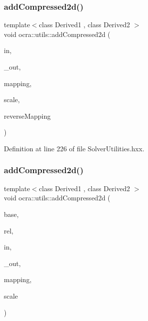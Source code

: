 \subsubsection{\texorpdfstring{add\+Compressed2d()}{addCompressed2d()}\hspace{0.1cm}{\footnotesize\ttfamily [1/2]}}
{\footnotesize\ttfamily template$<$class Derived1 , class Derived2 $>$ \\
void ocra\+::utils\+::add\+Compressed2d (\begin{DoxyParamCaption}\item[{const Matrix\+Base$<$ Derived1 $>$ \&}]{in,  }\item[{Matrix\+Base$<$ Derived2 $>$ const \&}]{\+\_\+out,  }\item[{const std\+::vector$<$ int $>$ \&}]{mapping,  }\item[{double}]{scale,  }\item[{bool}]{reverse\+Mapping }\end{DoxyParamCaption})\hspace{0.3cm}{\ttfamily [inline]}}



Definition at line 226 of file Solver\+Utilities.\+hxx.

\hypertarget{namespaceocra_1_1utils_af486ff6d7c311e33a0c7d647eb45bcd6}{}\label{namespaceocra_1_1utils_af486ff6d7c311e33a0c7d647eb45bcd6} 
\subsubsection{\texorpdfstring{add\+Compressed2d()}{addCompressed2d()}\hspace{0.1cm}{\footnotesize\ttfamily [2/2]}}
{\footnotesize\ttfamily template$<$class Derived1 , class Derived2 $>$ \\
void ocra\+::utils\+::add\+Compressed2d (\begin{DoxyParamCaption}\item[{const \hyperlink{classocra_1_1Variable}{Variable} \&}]{base,  }\item[{const \hyperlink{classocra_1_1Variable}{Variable} \&}]{rel,  }\item[{const Matrix\+Base$<$ Derived1 $>$ \&}]{in,  }\item[{Matrix\+Base$<$ Derived2 $>$ const \&}]{\+\_\+out,  }\item[{std\+::vector$<$ int $>$ \&}]{mapping,  }\item[{double}]{scale }\end{DoxyParamCaption})\hspace{0.3cm}{\ttfamily [inline]}}



